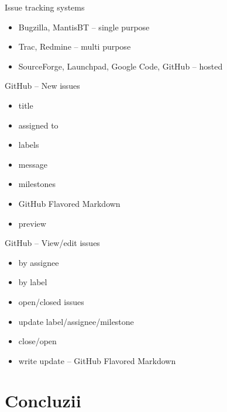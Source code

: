 \documentclass{beamer}
\begin{document}
\begin{frame}{Issue tracking systems}
  \begin{itemize}
    \item Bugzilla, MantisBT -- single purpose
    \item Trac, Redmine -- multi purpose
    \item SourceForge, Launchpad, Google Code, GitHub -- hosted
  \end{itemize}
\end{frame}

\begin{frame}{GitHub -- New issues}
  \begin{itemize}
    \item title
    \item assigned to
    \item labels
    \item message
    \item milestones
    \item GitHub Flavored Markdown
    \item preview
  \end{itemize}
\end{frame}

\begin{frame}{GitHub -- View/edit issues}
  \begin{itemize}
    \item by assignee
    \item by label
    \item open/closed issues
    \item update label/assignee/milestone
    \item close/open
    \item write update -- GitHub Flavored Markdown
  \end{itemize}
\end{frame}

\section{Concluzii}
\end{document}
